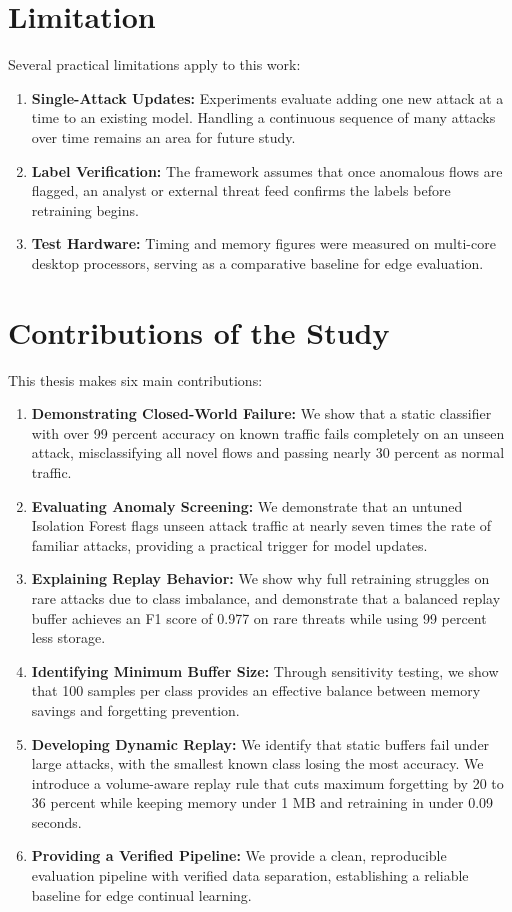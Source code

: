 \section{Limitation}
\label{sec:limitations_study}

Several practical limitations apply to this work:
\begin{enumerate}
    \item \textbf{Single-Attack Updates:} Experiments evaluate adding one new attack at a time to an existing model. Handling a continuous sequence of many attacks over time remains an area for future study.
    \item \textbf{Label Verification:} The framework assumes that once anomalous flows are flagged, an analyst or external threat feed confirms the labels before retraining begins.
    \item \textbf{Test Hardware:} Timing and memory figures were measured on multi-core desktop processors, serving as a comparative baseline for edge evaluation.
\end{enumerate}

\section{Contributions of the Study}
\label{sec:contributions_study}

This thesis makes six main contributions:

\begin{enumerate}
    \item \textbf{Demonstrating Closed-World Failure:} We show that a static classifier with over 99 percent accuracy on known traffic fails completely on an unseen attack, misclassifying all novel flows and passing nearly 30 percent as normal traffic.
    \item \textbf{Evaluating Anomaly Screening:} We demonstrate that an untuned Isolation Forest flags unseen attack traffic at nearly seven times the rate of familiar attacks, providing a practical trigger for model updates.
    \item \textbf{Explaining Replay Behavior:} We show why full retraining struggles on rare attacks due to class imbalance, and demonstrate that a balanced replay buffer achieves an F1 score of 0.977 on rare threats while using 99 percent less storage.
    \item \textbf{Identifying Minimum Buffer Size:} Through sensitivity testing, we show that 100 samples per class provides an effective balance between memory savings and forgetting prevention.
    \item \textbf{Developing Dynamic Replay:} We identify that static buffers fail under large attacks, with the smallest known class losing the most accuracy. We introduce a volume-aware replay rule that cuts maximum forgetting by 20 to 36 percent while keeping memory under 1 MB and retraining in under 0.09 seconds.
    \item \textbf{Providing a Verified Pipeline:} We provide a clean, reproducible evaluation pipeline with verified data separation, establishing a reliable baseline for edge continual learning.
\end{enumerate}

